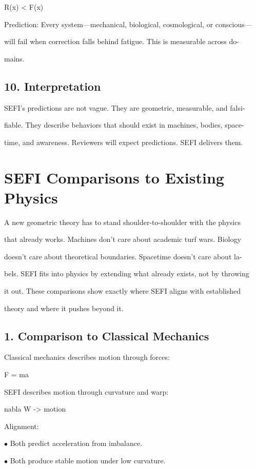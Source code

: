 \documentclass[10pt]{article}
\begin{document}
R(x) < F(x)

Prediction: Every system---mechanical, biological, cosmological, or conscious---

will fail when correction falls behind fatigue. This is measurable across do-

mains.


\subsection*{10. Interpretation}
SEFI's predictions are not vague. They are geometric, measurable, and falsi-

fiable. They describe behaviors that should exist in machines, bodies, space-

time, and awareness. Reviewers will expect predictions. SEFI delivers them.

\section*{SEFI Comparisons to Existing Physics}
A new geometric theory has to stand shoulder-to-shoulder with the physics

that already works. Machines don't care about academic turf wars. Biology

doesn't care about theoretical boundaries. Spacetime doesn't care about la-

bels. SEFI fits into physics by extending what already exists, not by throwing

it out. These comparisons show exactly where SEFI aligns with established

theory and where it pushes beyond it.

\subsection*{1. Comparison to Classical Mechanics}
Classical mechanics describes motion through forces:

F = ma

SEFI describes motion through curvature and warp:

nabla W -> motion

Alignment:

\noindent $\bullet$ Both predict acceleration from imbalance.

\noindent $\bullet$ Both produce stable motion under low curvature.
\end{document}
